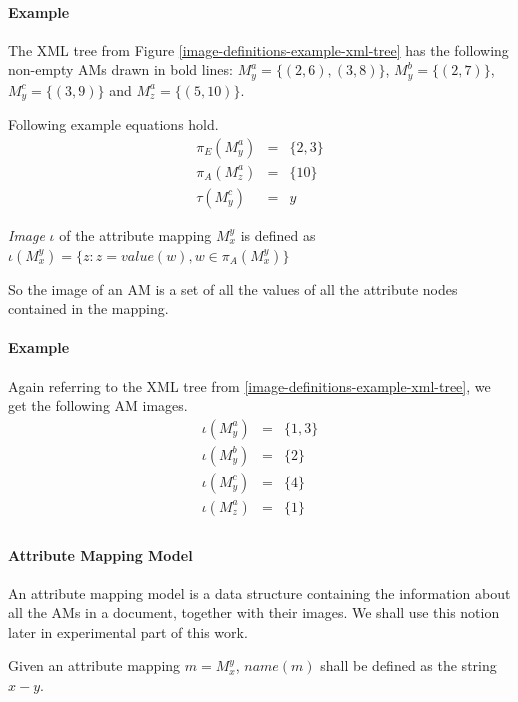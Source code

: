 \paragraph{Example}
The XML tree from Figure \ref{image-definitions-example-xml-tree} has the following non-empty AMs drawn in bold lines: $M_{y}^{a} = \{(2,6), (3,8)\}$, $M_{y}^{b} = \{(2,7)\}$, $M_{y}^{c} = \{(3,9)\}$ and $M_{z}^{a} = \{(5,10)\}$.

Following example equations hold.
\begin{eqnarray*}
\pi_E(M_{y}^{a}) & = & \{2, 3\} \\
\pi_A(M_{z}^{a}) & = & \{10\} \\
\tau(M_{y}^{c}) & = & y
\end{eqnarray*}

\begin{define}
	\textit{Image} $\iota$ of the attribute mapping $M_{x}^{y}$ is defined as $\iota(M_{x}^{y}) = \{z: z = value(w), w \in \pi_A(M_{x}^{y})\}$
\end{define}

So the image of an AM is a set of all the values of all the attribute nodes contained in the mapping.

\paragraph{Example}
Again referring to the XML tree from \ref{image-definitions-example-xml-tree}, we get the following AM images.
\begin{eqnarray*}
\iota(M_{y}^{a}) & = & \{1, 3\} \\
\iota(M_{y}^{b}) & = & \{2\} \\
\iota(M_{y}^{c}) & = & \{4\} \\
\iota(M_{z}^{a}) & = & \{1\} \\
\end{eqnarray*}

\paragraph{Attribute Mapping Model}
An attribute mapping model is a data structure containing the information about all the AMs in a document, together with their images. We shall use this notion later in experimental part of this work.

\begin{define}[$name()$]
	Given an attribute mapping $m = M_{x}^{y}$, $name(m)$ shall be defined as the string $x-y$.
\end{define}

